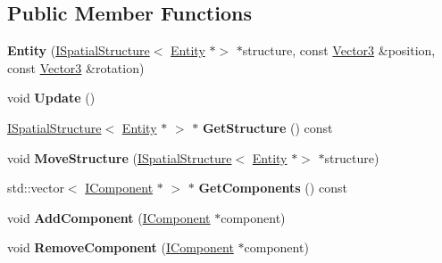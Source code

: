 \subsection*{Public Member Functions}
\begin{DoxyCompactItemize}
\item 
\mbox{\label{class_flounder_1_1_entity_a121e5a73dbdbb864d77cd1c4fb62a8ff}} 
{\bfseries Entity} (\hyperlink{class_flounder_1_1_i_spatial_structure}{I\+Spatial\+Structure}$<$ \hyperlink{class_flounder_1_1_entity}{Entity} $\ast$$>$ $\ast$structure, const \hyperlink{class_flounder_1_1_vector3}{Vector3} \&position, const \hyperlink{class_flounder_1_1_vector3}{Vector3} \&rotation)
\item 
\mbox{\label{class_flounder_1_1_entity_a4870c9e8e72483706e6528222654bf10}} 
void {\bfseries Update} ()
\item 
\mbox{\label{class_flounder_1_1_entity_af64e70f38f002a34681dd8947f0b039b}} 
\hyperlink{class_flounder_1_1_i_spatial_structure}{I\+Spatial\+Structure}$<$ \hyperlink{class_flounder_1_1_entity}{Entity} $\ast$ $>$ $\ast$ {\bfseries Get\+Structure} () const
\item 
\mbox{\label{class_flounder_1_1_entity_a4e81badaec3c506c1709b259b23f280d}} 
void {\bfseries Move\+Structure} (\hyperlink{class_flounder_1_1_i_spatial_structure}{I\+Spatial\+Structure}$<$ \hyperlink{class_flounder_1_1_entity}{Entity} $\ast$$>$ $\ast$structure)
\item 
\mbox{\label{class_flounder_1_1_entity_a6ed0a90370d4cd5b98109a8620b50531}} 
std\+::vector$<$ \hyperlink{class_flounder_1_1_i_component}{I\+Component} $\ast$ $>$ $\ast$ {\bfseries Get\+Components} () const
\item 
\mbox{\label{class_flounder_1_1_entity_aab59b8c5442df860dd9a47acd0360381}} 
void {\bfseries Add\+Component} (\hyperlink{class_flounder_1_1_i_component}{I\+Component} $\ast$component)
\item 
\mbox{\label{class_flounder_1_1_entity_a13fe0fd68438ec1030ea3242669616d9}} 
void {\bfseries Remove\+Component} (\hyperlink{class_flounder_1_1_i_component}{I\+Component} $\ast$component)

\end{DoxyCompactItemize}
